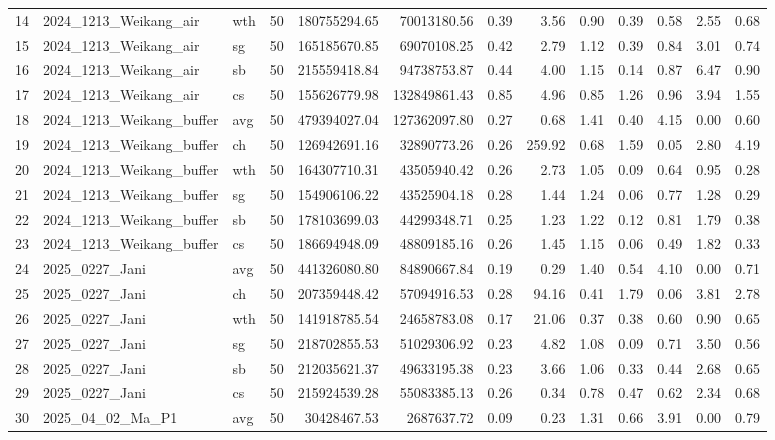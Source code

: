 \documentclass{article}
\begin{document}
\begin{table}[ht]
{\begin{tabular}{lllrrrrrrrrrr}
14 & 2024_1213_Weikang_air & wth & 50 & 180755294.65 & 70013180.56 & 0.39 & 3.56 & 0.90 & 0.39 & 0.58 & 2.55 & 0.68 \\
15 & 2024_1213_Weikang_air & sg & 50 & 165185670.85 & 69070108.25 & 0.42 & 2.79 & 1.12 & 0.39 & 0.84 & 3.01 & 0.74 \\
16 & 2024_1213_Weikang_air & sb & 50 & 215559418.84 & 94738753.87 & 0.44 & 4.00 & 1.15 & 0.14 & 0.87 & 6.47 & 0.90 \\
17 & 2024_1213_Weikang_air & cs & 50 & 155626779.98 & 132849861.43 & 0.85 & 4.96 & 0.85 & 1.26 & 0.96 & 3.94 & 1.55 \\
18 & 2024_1213_Weikang_buffer & avg & 50 & 479394027.04 & 127362097.80 & 0.27 & 0.68 & 1.41 & 0.40 & 4.15 & 0.00 & 0.60 \\
19 & 2024_1213_Weikang_buffer & ch & 50 & 126942691.16 & 32890773.26 & 0.26 & 259.92 & 0.68 & 1.59 & 0.05 & 2.80 & 4.19 \\
20 & 2024_1213_Weikang_buffer & wth & 50 & 164307710.31 & 43505940.42 & 0.26 & 2.73 & 1.05 & 0.09 & 0.64 & 0.95 & 0.28 \\
21 & 2024_1213_Weikang_buffer & sg & 50 & 154906106.22 & 43525904.18 & 0.28 & 1.44 & 1.24 & 0.06 & 0.77 & 1.28 & 0.29 \\
22 & 2024_1213_Weikang_buffer & sb & 50 & 178103699.03 & 44299348.71 & 0.25 & 1.23 & 1.22 & 0.12 & 0.81 & 1.79 & 0.38 \\
23 & 2024_1213_Weikang_buffer & cs & 50 & 186694948.09 & 48809185.16 & 0.26 & 1.45 & 1.15 & 0.06 & 0.49 & 1.82 & 0.33 \\
24 & 2025_0227_Jani & avg & 50 & 441326080.80 & 84890667.84 & 0.19 & 0.29 & 1.40 & 0.54 & 4.10 & 0.00 & 0.71 \\
25 & 2025_0227_Jani & ch & 50 & 207359448.42 & 57094916.53 & 0.28 & 94.16 & 0.41 & 1.79 & 0.06 & 3.81 & 2.78 \\
26 & 2025_0227_Jani & wth & 50 & 141918785.54 & 24658783.08 & 0.17 & 21.06 & 0.37 & 0.38 & 0.60 & 0.90 & 0.65 \\
27 & 2025_0227_Jani & sg & 50 & 218702855.53 & 51029306.92 & 0.23 & 4.82 & 1.08 & 0.09 & 0.71 & 3.50 & 0.56 \\
28 & 2025_0227_Jani & sb & 50 & 212035621.37 & 49633195.38 & 0.23 & 3.66 & 1.06 & 0.33 & 0.44 & 2.68 & 0.65 \\
29 & 2025_0227_Jani & cs & 50 & 215924539.28 & 55083385.13 & 0.26 & 0.34 & 0.78 & 0.47 & 0.62 & 2.34 & 0.68 \\
30 & 2025_04_02_Ma_P1 & avg & 50 & 30428467.53 & 2687637.72 & 0.09 & 0.23 & 1.31 & 0.66 & 3.91 & 0.00 & 0.79 \\

\end{tabular}}
\end{table}
\end{document}

